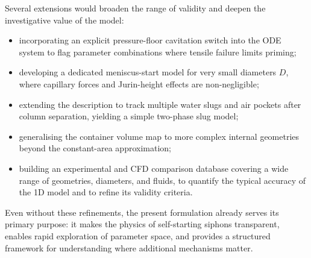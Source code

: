 \documentclass[11pt]{article}
\begin{document}
Several extensions would broaden the range of validity and deepen the investigative value of
the model:
\begin{itemize}
  \item incorporating an explicit pressure-floor cavitation switch into the ODE system to flag
        parameter combinations where tensile failure limits priming;
  \item developing a dedicated meniscus-start model for very small diameters $D$, where
        capillary forces and Jurin-height effects are non-negligible;
  \item extending the description to track multiple water slugs and air pockets after column
        separation, yielding a simple two-phase slug model;
  \item generalising the container volume map to more complex internal geometries beyond the
        constant-area approximation;
  \item building an experimental and CFD comparison database covering a wide range of geometries,
        diameters, and fluids, to quantify the typical accuracy of the 1D model and to refine
        its validity criteria.
\end{itemize}
Even without these refinements, the present formulation already serves its primary purpose:
it makes the physics of self-starting siphons transparent, enables rapid exploration of
parameter space, and provides a structured framework for understanding where additional
mechanisms matter.
\end{document}

